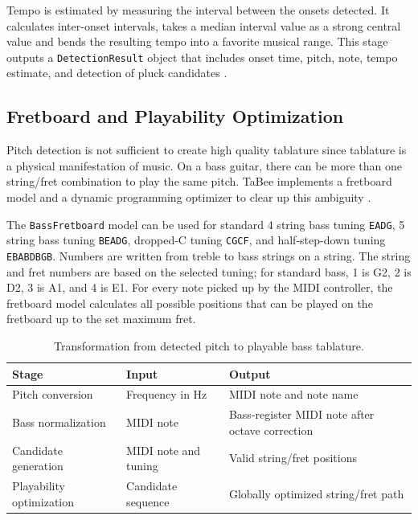 \documentclass[a4paper, 12pt, titlepage]{article}
\begin{document}
Tempo is estimated by measuring the interval between the onsets detected. It calculates inter-onset intervals, takes a median interval value as a strong central value and bends the resulting tempo into a favorite musical range. This stage outputs a \texttt{DetectionResult} object that includes onset time, pitch, note, tempo estimate, and detection of pluck candidates \cite{scheirer1998,goto2001,davies2007}.

\subsection{Fretboard and Playability Optimization}
Pitch detection is not sufficient to create high quality tablature since tablature is a physical manifestation of music. On a bass guitar, there can be more than one string/fret combination to play the same pitch. TaBee implements a fretboard model and a dynamic programming optimizer to clear up this ambiguity \cite{sayegh1989,grozman2006,skarha2018}.

The \texttt{BassFretboard} model can be used for standard 4 string bass tuning \texttt{EADG}, 5 string bass tuning \texttt{BEADG}, dropped-C tuning \texttt{CGCF}, and half-step-down tuning \texttt{EBABDBGB}. Numbers are written from treble to bass strings on a string. The string and fret numbers are based on the selected tuning; for standard bass, 1 is G2, 2 is D2, 3 is A1, and 4 is E1. For every note picked up by the MIDI controller, the fretboard model calculates all possible positions that can be played on the fretboard up to the set maximum fret.

\begin{table}[H]
    \centering
    \begin{tabular}{|p{}|p{}|p{}|}
        \hline
        \textbf{Stage} & \textbf{Input} & \textbf{Output} \\
        \hline
        Pitch conversion & Frequency in Hz & MIDI note and note name \\
        \hline
        Bass normalization & MIDI note & Bass-register MIDI note after octave correction \\
        \hline
        Candidate generation & MIDI note and tuning & Valid string/fret positions \\
        \hline
        Playability optimization & Candidate sequence & Globally optimized string/fret path \\
        \hline
    \end{tabular}
    \caption{Transformation from detected pitch to playable bass tablature.}
    \label{tab:tabee_pitch_to_tab}
\end{table}
\end{document}
